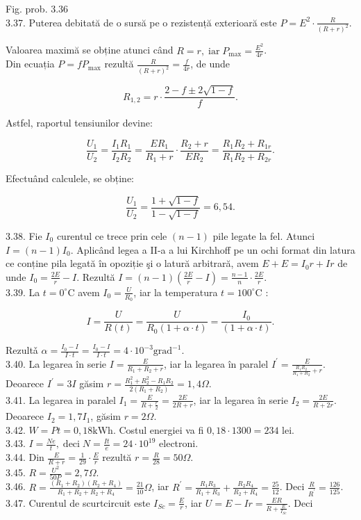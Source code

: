 \documentclass[10pt]{article}
\begin{document}
Fig. prob. 3.36\\
3.37. Puterea debitată de o sursă pe o rezistență exterioară este $P=E^{2} \cdot \frac{R}{(R+r)^{2}}$.

Valoarea maximă se obține atunci când $R=r, \operatorname{iar} P_{\max }=\frac{E^{2}}{4 r}$.\\
Din ecuația $P=f P_{\max }$ rezultă $\frac{R}{(R+r)^{2}}=\frac{f}{4 r}$, de unde

$$
R_{1,2}=r \cdot \frac{2-f \pm 2 \sqrt{1-f}}{f} .
$$

Astfel, raportul tensiunilor devine:

$$
\frac{U_{1}}{U_{2}}=\frac{I_{1} R_{1}}{I_{2} R_{2}}=\frac{E R_{1}}{R_{1}+r} \cdot \frac{R_{2}+r}{E R_{2}}=\frac{R_{1} R_{2}+R_{1 r}}{R_{1} R_{2}+R_{2 r}} .
$$

Efectuând calculele, se obține:

$$
\frac{U_{1}}{U_{2}}=\frac{1+\sqrt{1-f}}{1-\sqrt{1-f}}=6,54 .
$$

3.38. Fie $I_{0}$ curentul ce trece prin cele $(n-1)$ pile legate la fel. Atunci $I=(n-1) I_{0}$. Aplicând legea a II-a a lui Kirchhoff pe un ochi format din latura ce conține pila legată în opoziție şi o latură arbitrară, avem $E+E=I_{0} r+I r$ de unde $I_{0}=\frac{2 E}{r}-I$. Rezultă $I=(n-1)\left(\frac{2 E}{r}-I\right)=\frac{n-1}{n} \cdot \frac{2 E}{r}$.\\
3.39. La $t=0^{\circ} \mathrm{C}$ avem $I_{0}=\frac{U}{R_{0}}$, iar la temperatura $t=100^{\circ} \mathrm{C}$ :

$$
I=\frac{U}{R(t)}=\frac{U}{R_{0}(1+\alpha \cdot t)}=\frac{I_{0}}{(1+\alpha \cdot t)} .
$$

Rezultǎ $\alpha=\frac{I_{0}-I}{I \cdot t}=\frac{I_{0}-I}{I \cdot t}=4 \cdot 10^{-3} \mathrm{grad}^{-1}$.\\
3.40. La legarea în serie $I=\frac{E}{R_{1}+R_{2}+r}$, iar la legarea în paralel $I^{\prime}=\frac{E}{\frac{R_{1} R_{2}}{R_{1}+R_{2}}+r}$. Deoarece $I^{\prime}=3 I$ găsim $r=\frac{R_{1}^{2}+R_{2}^{2}-R_{1} R_{2}}{2\left(R_{1}+R_{2}\right)}=1,4 \Omega$.\\
3.41. La legarea in paralel $I_{1}=\frac{E}{R+\frac{r}{2}}=\frac{2 E}{2 R+r}$, iar la legarea în serie $I_{2}=\frac{2 E}{R+2 r}$. Deoarece $I_{2}=1,7 I_{1}$, găsim $r=2 \Omega$.\\
3.42. $W=P t=0,18 \mathrm{kWh}$. Costul energiei va fi $0,18 \cdot 1300=234$ lei.\\
3.43. $I=\frac{N e}{t}, \operatorname{deci} N=\frac{I t}{e}=24 \cdot 10^{19}$ electroni.\\
3.44. Din $\frac{E}{R+r}=\frac{1}{29} \cdot \frac{E}{r}$ rezultă $r=\frac{R}{28}=50 \Omega$.\\
3.45. $R=\frac{U^{2}}{50 P}=2,7 \Omega$.\\
3.46. $R=\frac{\left(R_{1}+R_{2}\right)\left(R_{2}+R_{4}\right)}{R_{1}+R_{2}+R_{2}+R_{4}}=\frac{21}{10} \Omega$, iar $R^{\prime}=\frac{R_{1} R_{3}}{R_{1}+R_{3}}+\frac{R_{2} R_{4}}{R_{2}+R_{4}}=\frac{25}{12}$. Deci $\frac{R}{R^{\prime}}=\frac{126}{125}$.\\
3.47. Curentul de scurtcircuit este $I_{S c}=\frac{E}{r}$, iar $U=E-I r=\frac{E R}{R+\frac{E}{I_{S c}}}$. Deci
\end{document}
